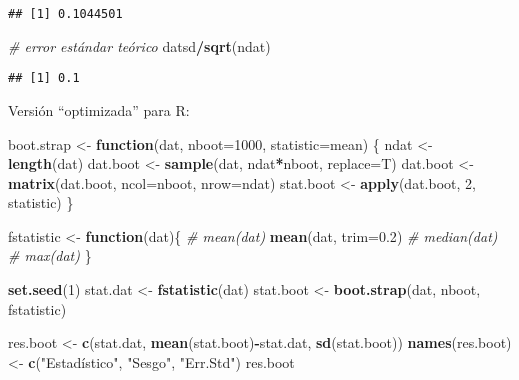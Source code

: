 \documentclass[
]{book}
\newenvironment{Shaded}{\begin{snugshade}}{\end{snugshade}}
\newcommand{\CommentTok}[1]{\textcolor[rgb]{0.56,0.35,0.01}{\textit{#1}}}
\newcommand{\ControlFlowTok}[1]{\textcolor[rgb]{0.13,0.29,0.53}{\textbf{#1}}}
\newcommand{\DataTypeTok}[1]{\textcolor[rgb]{0.13,0.29,0.53}{#1}}
\newcommand{\DecValTok}[1]{\textcolor[rgb]{0.00,0.00,0.81}{#1}}
\newcommand{\FloatTok}[1]{\textcolor[rgb]{0.00,0.00,0.81}{#1}}
\newcommand{\KeywordTok}[1]{\textcolor[rgb]{0.13,0.29,0.53}{\textbf{#1}}}
\newcommand{\NormalTok}[1]{#1}
\newcommand{\OperatorTok}[1]{\textcolor[rgb]{0.81,0.36,0.00}{\textbf{#1}}}
\newcommand{\StringTok}[1]{\textcolor[rgb]{0.31,0.60,0.02}{#1}}
\theoremstyle{break}
\theoremstyle{definition}
\theoremstyle{definition}
\theoremstyle{definition}
\theoremstyle{remark}
\begin{document}
\begin{verbatim}
## [1] 0.1044501
\end{verbatim}

\begin{Shaded}
\begin{Highlighting}[]
\CommentTok{# error estándar teórico}
\NormalTok{datsd}\OperatorTok{/}\KeywordTok{sqrt}\NormalTok{(ndat) }
\end{Highlighting}
\end{Shaded}

\begin{verbatim}
## [1] 0.1
\end{verbatim}

Versión ``optimizada'' para R:

\begin{Shaded}
\begin{Highlighting}[]
\NormalTok{boot.strap <-}\StringTok{ }\ControlFlowTok{function}\NormalTok{(dat, }\DataTypeTok{nboot=}\DecValTok{1000}\NormalTok{, }\DataTypeTok{statistic=}\NormalTok{mean)}
\NormalTok{\{}
\NormalTok{  ndat <-}\StringTok{ }\KeywordTok{length}\NormalTok{(dat)}
\NormalTok{  dat.boot <-}\StringTok{ }\KeywordTok{sample}\NormalTok{(dat, ndat}\OperatorTok{*}\NormalTok{nboot, }\DataTypeTok{replace=}\NormalTok{T)}
\NormalTok{  dat.boot <-}\StringTok{ }\KeywordTok{matrix}\NormalTok{(dat.boot, }\DataTypeTok{ncol=}\NormalTok{nboot, }\DataTypeTok{nrow=}\NormalTok{ndat)}
\NormalTok{  stat.boot <-}\StringTok{ }\KeywordTok{apply}\NormalTok{(dat.boot, }\DecValTok{2}\NormalTok{, statistic)}
\NormalTok{\}}

\NormalTok{fstatistic <-}\StringTok{ }\ControlFlowTok{function}\NormalTok{(dat)\{}
  \CommentTok{#  mean(dat)}
  \KeywordTok{mean}\NormalTok{(dat, }\DataTypeTok{trim=}\FloatTok{0.2}\NormalTok{)}
  \CommentTok{#  median(dat)}
  \CommentTok{#  max(dat)}
\NormalTok{\}}

\KeywordTok{set.seed}\NormalTok{(}\DecValTok{1}\NormalTok{)}
\NormalTok{stat.dat <-}\StringTok{ }\KeywordTok{fstatistic}\NormalTok{(dat)}
\NormalTok{stat.boot <-}\StringTok{ }\KeywordTok{boot.strap}\NormalTok{(dat, nboot, fstatistic)}

\NormalTok{res.boot <-}\StringTok{ }\KeywordTok{c}\NormalTok{(stat.dat, }\KeywordTok{mean}\NormalTok{(stat.boot)}\OperatorTok{-}\NormalTok{stat.dat, }\KeywordTok{sd}\NormalTok{(stat.boot))}
\KeywordTok{names}\NormalTok{(res.boot) <-}\StringTok{ }\KeywordTok{c}\NormalTok{(}\StringTok{"Estadístico"}\NormalTok{, }\StringTok{"Sesgo"}\NormalTok{, }\StringTok{"Err.Std"}\NormalTok{)}
\NormalTok{res.boot}
\end{Highlighting}
\end{Shaded}
\end{document}
